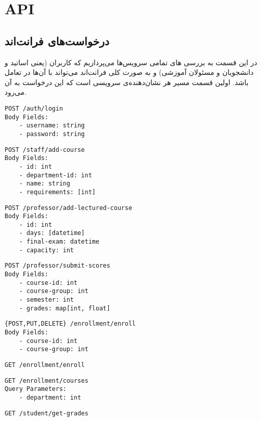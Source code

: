 \section{API}
\subsection{درخواست‌های فرانت‌اند}
در این قسمت به بررسی
های
تمامی سرویس‌ها می‌پردازیم که کاربران
(یعنی اساتید و دانشجویان و مسئولان آموزشی)
و به صورت کلی فرانت‌اند می‌تواند با آن‌ها در تعامل باشد. اولین قسمت مسیر هر
نشان‌دهنده‌ی سرویسی است که این درخواست به آن می‌رود.
\begin{latin}
\begin{lstlisting}
POST /auth/login
Body Fields:
    - username: string
    - password: string
\end{lstlisting}
\end{latin}
\begin{latin}
\begin{lstlisting}
POST /staff/add-course
Body Fields:
    - id: int
    - department-id: int
    - name: string
    - requirements: [int]
\end{lstlisting}
\end{latin}
\begin{latin}
\begin{lstlisting}
POST /professor/add-lectured-course
Body Fields:
    - id: int
    - days: [datetime]
    - final-exam: datetime
    - capacity: int
\end{lstlisting}
\end{latin}
\begin{latin}
\begin{lstlisting}
POST /professor/submit-scores
Body Fields:
    - course-id: int
    - course-group: int
    - semester: int
    - grades: map[int, float]
\end{lstlisting}
\end{latin}
\begin{latin}
\begin{lstlisting}
{POST,PUT,DELETE} /enrollment/enroll
Body Fields:
    - course-id: int
    - course-group: int
\end{lstlisting}
\end{latin}
\begin{latin}
\begin{lstlisting}
GET /enrollment/enroll
\end{lstlisting}
\end{latin}
\begin{latin}
\begin{lstlisting}
GET /enrollment/courses
Query Parameters:
    - department: int
\end{lstlisting}
\end{latin}
\begin{latin}
\begin{lstlisting}
GET /student/get-grades
\end{lstlisting}
\end{latin}
